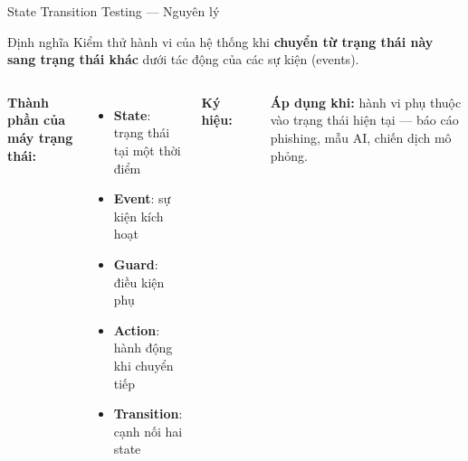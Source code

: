 \documentclass[aspectratio=169,12pt]{beamer}
\begin{document}
\begin{frame}[shrink=10]{State Transition Testing --- Nguyên lý}
  \begin{block}{Định nghĩa}
    Kiểm thử hành vi của hệ thống khi \textbf{chuyển từ trạng thái này
    sang trạng thái khác} dưới tác động của các sự kiện (events).
  \end{block}

  \vspace{0.1em}
  \small
  \begin{columns}[T,totalwidth=\textwidth]
    \textbf{Thành phần của máy trạng thái:}
    \begin{itemize}
      \item \textbf{State}: trạng thái tại một thời điểm
      \item \textbf{Event}: sự kiện kích hoạt
      \item \textbf{Guard}: điều kiện phụ
      \item \textbf{Action}: hành động khi chuyển tiếp
      \item \textbf{Transition}: cạnh nối hai state
    \end{itemize}

    \textbf{Ký hiệu:}
    \begin{center}
    \end{center}

    \vspace{0.3em}
    \textbf{Áp dụng khi:} hành vi phụ thuộc vào trạng thái hiện tại
    --- báo cáo phishing, mẫu AI, chiến dịch mô phỏng.
  \end{columns}
\end{frame}
\end{document}
